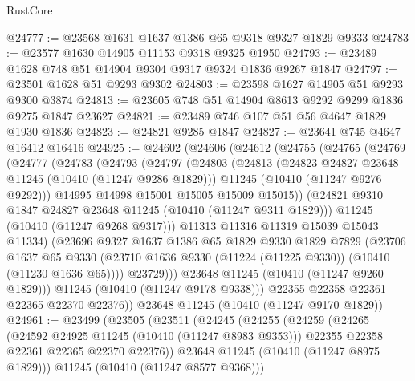 \begin{lexlean}{RustCore}
\begin{coremodule}
@24777 := @23568 @1631 @1637 @1386 @65 @9318 @9327 @1829 @9333
@24783 := @23577 @1630 @14905 @11153 @9318 @9325 @1950
@24793 := @23489 @1628 @748 @51 @14904 @9304 @9317 @9324 @1836 @9267 @1847
@24797 := @23501 @1628 @51 @9293 @9302
@24803 := @23598 @1627 @14905 @51 @9293 @9300 @3874
@24813 := @23605 @748 @51 @14904 @8613 @9292 @9299 @1836 @9275 @1847 @23627
@24821 := @23489 @746 @107 @51 @56 @4647 @1829 @1930 @1836
@24823 := @24821 @9285 @1847
@24827 := @23641 @745 @4647 @16412 @16416
@24925 := @24602
    (@24606
      (@24612
        (@24755
          (@24765
            (@24769
              (@24777
                (@24783
                  (@24793
                    (@24797
                      (@24803
                        (@24813
                          (@24823 @24827 @23648 @11245 (@10410 (@11247 @9286 @1829)))
                          @11245
                          (@10410 (@11247 @9276 @9292)))
                        @14995
                        @14998
                        @15001
                        @15005
                        @15009
                        @15015))
                    (@24821 @9310 @1847 @24827 @23648 @11245 (@10410 (@11247 @9311 @1829)))
                    @11245
                    (@10410 (@11247 @9268 @9317)))
                  @11313
                  @11316
                  @11319
                  @15039
                  @15043
                  @11334)
                (@23696
                  @9327
                  @1637
                  @1386
                  @65
                  @1829
                  @9330
                  @1829
                  @7829
                  (@23706
                    @1637
                    @65
                    @9330
                    (@23710 @1636 @9330 (@11224 (@11225 @9330)) (@10410 (@11230 @1636 @65))))
                  @23729)))
            @23648
            @11245
            (@10410 (@11247 @9260 @1829)))
          @11245
          (@10410 (@11247 @9178 @9338)))
        @22355
        @22358
        @22361
        @22365
        @22370
        @22376))
    @23648
    @11245
    (@10410 (@11247 @9170 @1829))
@24961 := @23499
    (@23505
      (@23511
        (@24245
          (@24255
            (@24259
              (@24265
                (@24592 @24925 @11245 (@10410 (@11247 @8983 @9353)))
                @22355
                @22358
                @22361
                @22365
                @22370
                @22376))
            @23648
            @11245
            (@10410 (@11247 @8975 @1829)))
          @11245
          (@10410 (@11247 @8577 @9368)))

\end{coremodule}
\end{lexlean}
